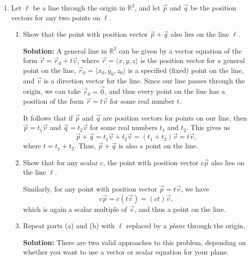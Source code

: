 \documentclass[letterpaper,12pt]{article}
\newcommand{\R}{\mathbb{R}}
\begin{document}
\begin{enumerate}
\begin{enumerate}
\medskip

\end{enumerate}

\item  Let $\ell$ be a line through the origin in $\R^3$, and let $\vec{p}$ and $\vec{q}$ be the position vectors for any two points on $\ell$.
\begin{enumerate}
 \item Show that the point with position vector $\vec{p}+\vec{q}$ also lies on the line $\ell$.

\bigskip

{\bf Solution:} A general line in $\R^3$ can be given by a vector equation of the form $\vec{r} = \vec{r}_0+t\vec{v}$, where $\vec{r}=\langle x,y,z\rangle$ is the position vector for a general point on the line, $\vec{r}_0 = \langle x_0,y_0,z_0\rangle$ is a specified (fixed) point on the line, and $\vec{v}$ is a direction vector for the line. Since our line passes through the origin, we can take $\vec{r}_0=\vec{0}$, and thus every point on the line has a position of the form $\vec{r} = t\vec{v}$ for some real number $t$.

It follows that if $\vec{p}$ and $\vec{q}$ are position vectors for points on our line, then $\vec{p} = t_1\vec{v}$ and $\vec{q} = t_2\vec{v}$ for some real numbers $t_1$ and $t_2$. This gives us
\[
 \vec{p}+\vec{q} = t_1\vec{v}+t_2\vec{v} = (t_1+t_2)\vec{v} = t\vec{v},
\]
where $t=t_1+t_2$. Thus, $\vec{p}+\vec{q}$ is also a point on the line.

\medskip


 \item Show that for any scalar $c$, the point with position vector $c\vec{p}$ also lies on the line $\ell$.

\bigskip

Similarly, for any point with position vector $\vec{p} = t\vec{v}$, we have
\[
 c\vec{p} = c(t\vec{v}) = (ct)\vec{v},
\]
which is again a scalar multiple of $\vec{v}$, and thus a point on the line.

\medskip

 \item Repeat parts (a) and (b) with $\ell$ replaced by a \textit{plane} through the origin.

\bigskip

{\bf Solution:} There are two valid approaches to this problem, depending on whether you want to use a vector or scalar equation for your plane.


\end{enumerate}
\end{enumerate}
\end{document}
